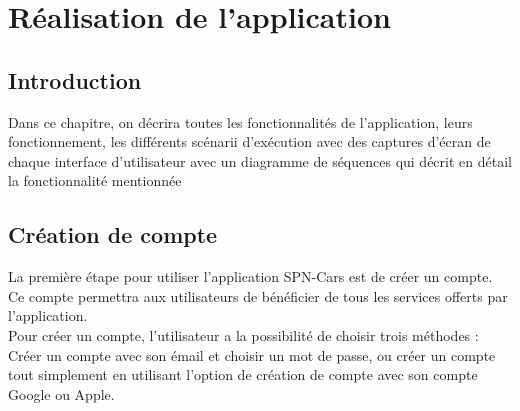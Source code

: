 \chapter{Réalisation de l'application}
\minitoc
\clearpage
\section{Introduction} Dans ce chapitre, on décrira toutes les fonctionnalités de l'application, leurs fonctionnement, les différents scénarii d'exécution avec des captures d'écran de chaque interface d'utilisateur avec un diagramme de séquences qui décrit en détail la fonctionnalité mentionnée
\justifying
\section{Création de compte}
La première étape pour utiliser l'application SPN-Cars est de créer un compte. Ce compte permettra aux utilisateurs de bénéficier de tous les services offerts par l'application.\\
\noindent Pour créer un compte, l'utilisateur a la possibilité de choisir trois méthodes : Créer un compte avec son émail et choisir un mot de passe, ou créer un compte tout simplement en utilisant l'option de création de compte avec son compte Google ou Apple.
